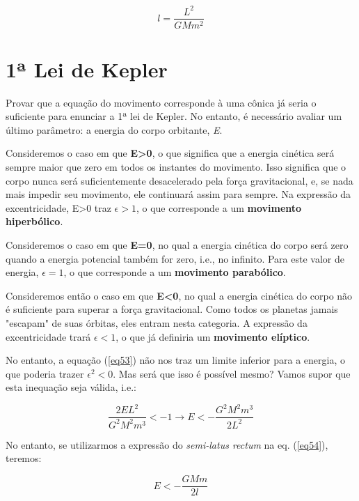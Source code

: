 \begin{equation}
	l = \frac{L^2}{GMm^2} \label{eq54}
\end{equation}

\section{1ª Lei de Kepler}

Provar que a equação do movimento corresponde à uma cônica já seria o suficiente para enunciar a 1ª lei de Kepler. No entanto, é necessário avaliar um último parâmetro: a energia do corpo orbitante, \textit{E}.{\\}

Consideremos o caso em que \textbf{E>0}, o que significa que a energia cinética será sempre maior que zero em todos os instantes do movimento. Isso significa que o corpo nunca será suficientemente desacelerado pela força gravitacional, e, se nada mais impedir seu movimento, ele continuará assim para sempre. Na expressão da excentricidade, E>0 traz $\epsilon>1$, o que corresponde a um \textbf{movimento hiperbólico}. {\\}

Consideremos o caso em que \textbf{E=0}, no qual a energia cinética do corpo será zero quando a energia potencial também for zero, i.e., no infinito. Para este valor de energia, $\epsilon=1$, o que corresponde a um \textbf{movimento parabólico}. {\\}

Consideremos então o caso em que \textbf{E<0}, no qual a energia cinética do corpo não é suficiente para superar a força gravitacional. Como todos os planetas jamais "escapam" de suas órbitas, eles entram nesta categoria. A expressão da excentricidade trará $\epsilon<1$, o que já definiria um \textbf{movimento elíptico}.{\\}

No entanto, a equação (\ref{eq53}) não nos traz um limite inferior para a energia, o que poderia trazer $\epsilon^2<0$. Mas será que isso é possível mesmo? Vamos supor que esta inequação seja válida, i.e.:

\[
	\frac{2EL^2}{G^2M^2m^3}<-1 \rightarrow E<-\frac{G^2M^2m^3}{2L^2}
\]

No entanto, se utilizarmos a expressão do \textit{semi-latus rectum} na eq. (\ref{eq54}), teremos:

\begin{equation}
	E<-\frac{GMm}{2l}		\label{eq55}
\end{equation}

